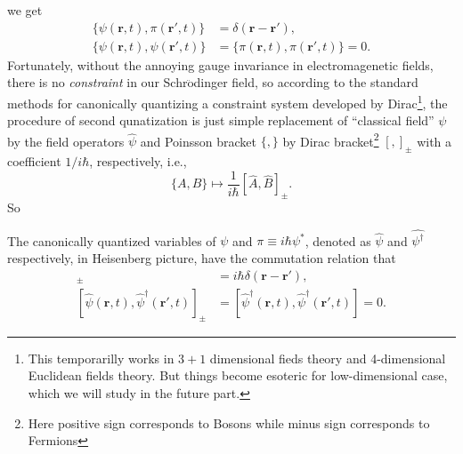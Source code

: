 \documentclass[b5paper,10pt,UTF8]{book}
\numberwithin{equation}{section}
\begin{document}
		we get
		\begin{align}
			\{\psi(\bm{r},t),\pi(\bm{r'},t)\}&=\delta(\bm{r}-\bm{r'}),\label{1.2.4}\\
			\{\psi(\bm{r},t),\psi(\bm{r'},t)\}&=\{\pi(\bm{r},t),\pi(\bm{r'},t)\}=0.\label{1.2.5}
		\end{align}
		\indent Fortunately, without the annoying gauge invariance in electromagenetic fields, there is no \emph{constraint} in our Schr$\ddot{\text{o}}$dinger field, so according to the standard methods for canonically quantizing a constraint system developed by Dirac\footnote{This temporarilly works in $3+1$ dimensional fieds theory and 4-dimensional Euclidean fields theory. But things become esoteric for low-dimensional case, which we will study in the future part.}, the procedure of second qunatization is just simple replacement of ``classical field'' $\psi$ by the field operators $\hat{\psi}$ and Poinsson bracket $\{,\}$ by Dirac bracket\footnote{Here positive sign corresponds to Bosons while minus sign corresponds to Fermions} $[,]_{\pm}$ with a coefficient $1/i\hbar$, respectively, i.e.,
		$$\{A,B\}\mapsto\dfrac{1}{i\hbar}[\hat{A},\hat{B}]_{\pm}.$$
		So
		\begin{Axiom}
			The canonically quantized variables of $\psi$ and $\pi\equiv i\hbar\psi^*$, denoted as $\hat{\psi}$ and $\hat{\psi^\dagger}$ respectively, in Heisenberg picture, have the commutation relation that
			\begin{align}
				[\hat{\psi}(\bm{r},t),\hat{\psi}^\dagger(\bm{r'},t)]_{\pm}&=i\hbar\delta(\bm{r}-\bm{r'}),\label{1.2.6}\\
				[\hat{\psi}(\bm{r},t),\hat{\psi}^\dagger(\bm{r'},t)]_{\pm}&=[\hat{\psi}^\dagger(\bm{r},t),\hat{\psi}^\dagger(\bm{r'},t)]=0.\label{1.2.7}
			\end{align}
		\end{Axiom}
\end{document}
